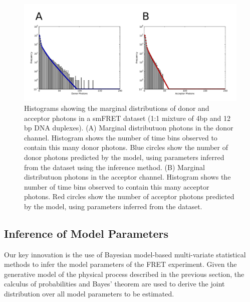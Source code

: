 

\begin{figure}
   \begin{center}
      \includegraphics*[width=6in]{inference/marginal_distributions.pdf}
      \caption{Histograms showing the marginal distributions of donor and acceptor photons in a smFRET dataset (1:1 mixture of 4bp and 12 bp DNA duplexes). (A) Marginal distributuon photons in the donor channel. Histogram shows the number of time bins observed to contain this many donor photons. Blue circles show the number of donor photons predicted by the model, using parameters inferred from the dataset using the inference method. (B) Marginal distributuon photons in the acceptor channel. Histogram shows the number of time bins observed to contain this many acceptor photons. Red circles show the number of acceptor photons predicted by the model, using parameters inferred from the dataset.}
      \label{fig:marginals}
   \end{center}
\end{figure}

\clearpage

\subsection{Inference of Model Parameters}
Our key innovation is the use of Bayesian model-based multi-variate statistical methods to infer the model parameters of the FRET experiment. Given the generative model of the physical process described in the previous section, the calculus of probabilities and Bayes' theorem are used to derive the joint distribution over all model parameters to be estimated.

